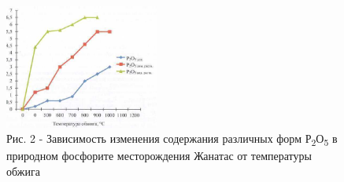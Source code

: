 \begin{figure}[H]
	\centering
	\includegraphics[width=0.45\textwidth]{assets/1082}
	\caption*{Рис. 2 - Зависимость изменения содержания различных форм Р\textsubscript{2}О\textsubscript{5} в природном фосфорите месторождения Жанатас от температуры обжига}
\end{figure}

